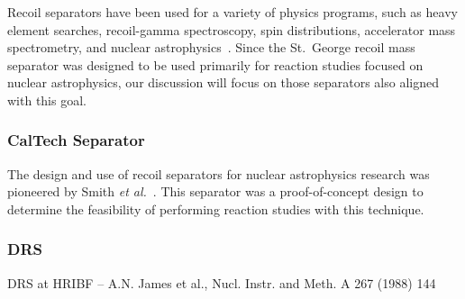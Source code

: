 Recoil separators have been used for a variety of physics programs, such as
heavy element searches, recoil-gamma spectroscopy, spin distributions,
accelerator mass spectrometry, and nuclear astrophysics~\cite{Davids2003}.
Since the St.\ George recoil mass separator was designed to be used primarily
for reaction studies focused on nuclear astrophysics, our discussion will
focus on those separators also aligned with this goal.

\subsubsection{CalTech Separator}

The design and use of recoil separators for nuclear astrophysics research was
pioneered by Smith \textit{et al.}~\cite{Smith1991}. This separator was a
proof-of-concept design to
determine the feasibility of performing reaction studies with this technique.

\subsubsection{DRS}

DRS at HRIBF -- A.N. James et al., Nucl. Instr. and Meth. A 267 (1988) 144



